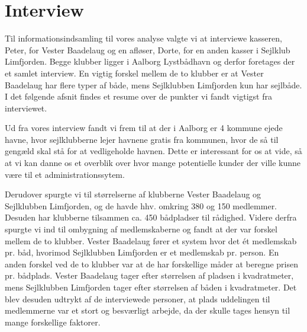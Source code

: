 \chapter{Interview}
\label{chap:Interview}
Til informationsindsamling til vores analyse valgte vi at interviewe kasseren, Peter, for Vester Baadelaug og en afløser, Dorte, for en anden kasser i Sejlklub Limfjorden. Begge klubber ligger i Aalborg Lystbådhavn og derfor foretages der et samlet interview. En vigtig forskel mellem de to klubber er at Vester Baadelaug har flere typer af både, mens Sejlklubben Limfjorden kun har sejlbåde. I det følgende afsnit findes et resume over de punkter vi fandt vigtigst fra interviewet.

Ud fra vores interview fandt vi frem til at der i Aalborg er 4 kommune ejede havne, hvor sejlklubberne lejer havnene gratis fra kommunen, hvor de så til gengæld skal stå for at vedligeholde havnen. Dette er interessant for os at vide, så at vi kan danne os et overblik over hvor mange potentielle kunder der ville kunne være til et administrationssytem. 

Derudover spurgte vi til størrelserne af klubberne Vester Baadelaug og Sejlklubben Limfjorden, og de havde hhv. omkring 380 og 150 medlemmer. Desuden har klubberne tilsammen ca. 450 bådpladser til rådighed. Videre derfra spurgte vi ind til ombygning af medlemskaberne og fandt at der var forskel mellem de to klubber. Vester Baadelaug fører et system hvor det ét medlemskab pr. båd, hvorimod Sejlklubben Limfjorden er et medlemskab pr. person. En anden forskel ved de to klubber var at de har forskellige måder at beregne prisen pr. bådplads. Vester Baadelaug tager efter størrelsen af pladsen i kvadratmeter, mens Sejlklubben Limfjorden tager efter størrelsen af båden i kvadratmeter. Det blev desuden udtrykt af de interviewede personer, at plads uddelingen til medlemmerne var et stort og besværligt arbejde, da der skulle tages hensyn til mange forskellige faktorer.


